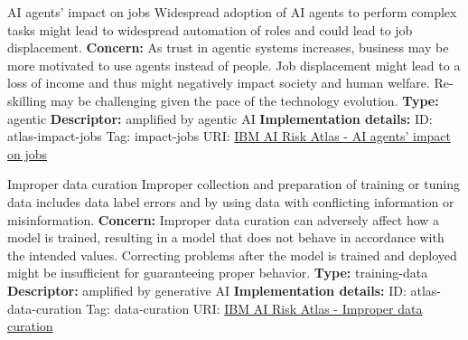 \begin{definitionbox}{AI agents' impact on jobs}
Widespread adoption of AI agents to perform complex tasks might lead to widespread automation of roles and could lead to job displacement.\newline\newline
\textbf{Concern: }As trust in agentic systems increases, business may be more motivated to use agents instead of people. Job displacement might lead to a loss of income and thus might negatively impact society and human welfare. Re-skilling may be challenging given the pace of the technology evolution.\newline\newline
\textbf{Type: }agentic\newline
\textbf{Descriptor: }amplified by agentic AI \newline\newline
\textbf{Implementation details: } \newline
ID: atlas-impact-jobs \newline
Tag: impact-jobs \newline
URI:  \href{https://www.ibm.com/docs/en/watsonx/saas?topic=SSYOK8/wsj/ai-risk-atlas/impact-jobs.html}{IBM AI Risk Atlas - AI agents' impact on jobs}\newline
\end{definitionbox}
\begin{definitionbox}{Improper data curation}
Improper collection and preparation of training or tuning data includes data label errors and by using data with conflicting information or misinformation.\newline\newline
\textbf{Concern: }Improper data curation can adversely affect how a model is trained, resulting in a model that does not behave in accordance with the intended values. Correcting problems after the model is trained and deployed might be insufficient for guaranteeing proper behavior. \newline\newline
\textbf{Type: }training-data\newline
\textbf{Descriptor: }amplified by generative AI \newline\newline
\textbf{Implementation details: } \newline
ID: atlas-data-curation \newline
Tag: data-curation \newline
URI:  \href{https://www.ibm.com/docs/en/watsonx/saas?topic=SSYOK8/wsj/ai-risk-atlas/data-curation.html}{IBM AI Risk Atlas - Improper data curation}\newline
\end{definitionbox}
